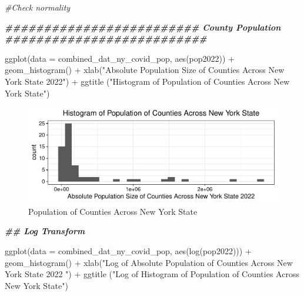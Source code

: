 \documentclass[
  12pt,
]{article}
\newenvironment{Shaded}{\begin{snugshade}}{\end{snugshade}}
\newcommand{\AttributeTok}[1]{\textcolor[rgb]{0.77,0.63,0.00}{#1}}
\newcommand{\CommentTok}[1]{\textcolor[rgb]{0.56,0.35,0.01}{\textit{#1}}}
\newcommand{\DocumentationTok}[1]{\textcolor[rgb]{0.56,0.35,0.01}{\textbf{\textit{#1}}}}
\newcommand{\FunctionTok}[1]{\textcolor[rgb]{0.00,0.00,0.00}{#1}}
\newcommand{\NormalTok}[1]{#1}
\newcommand{\SpecialCharTok}[1]{\textcolor[rgb]{0.00,0.00,0.00}{#1}}
\newcommand{\StringTok}[1]{\textcolor[rgb]{0.31,0.60,0.02}{#1}}
\begin{document}
\begin{Shaded}
\begin{Highlighting}[]
\CommentTok{\#Check normality}
\end{Highlighting}
\end{Shaded}

\begin{Shaded}
\begin{Highlighting}[]
\DocumentationTok{\#\#\#\#\#\#\#\#\#\#\#\#\#\#\#\#\#\#\#\#\#\#\#\#\# County Population \#\#\#\#\#\#\#\#\#\#\#\#\#\#\#\#\#\#\#\#\#\#\#\#\#\#}

\FunctionTok{ggplot}\NormalTok{(}\AttributeTok{data =}\NormalTok{ combined\_dat\_ny\_covid\_pop, }\FunctionTok{aes}\NormalTok{(pop2022)) }\SpecialCharTok{+}
  \FunctionTok{geom\_histogram}\NormalTok{() }\SpecialCharTok{+}
  \FunctionTok{xlab}\NormalTok{(}\StringTok{"Absolute Population Size of Counties Across New York State 2022"}\NormalTok{) }\SpecialCharTok{+}
  \FunctionTok{ggtitle}\NormalTok{ (}\StringTok{"Histogram of Population of Counties Across New York State"}\NormalTok{)}
\end{Highlighting}
\end{Shaded}

\begin{figure}

{\centering \includegraphics{EDA_Final_Group_Project_files/figure-latex/unnamed-chunk-8-1} 

}

\caption{Population of Counties Across New York State}\label{fig:unnamed-chunk-8}
\end{figure}

\begin{Shaded}
\begin{Highlighting}[]
\DocumentationTok{\#\# Log Transform}

\FunctionTok{ggplot}\NormalTok{(}\AttributeTok{data =}\NormalTok{ combined\_dat\_ny\_covid\_pop, }\FunctionTok{aes}\NormalTok{(}\FunctionTok{log}\NormalTok{(pop2022))) }\SpecialCharTok{+}
  \FunctionTok{geom\_histogram}\NormalTok{() }\SpecialCharTok{+}
  \FunctionTok{xlab}\NormalTok{(}\StringTok{"Log of Absolute Population of Counties Across New York State 2022 "}\NormalTok{) }\SpecialCharTok{+}
  \FunctionTok{ggtitle}\NormalTok{ (}\StringTok{"Log of Histogram of Population of Counties Across New York State"}\NormalTok{)}
\end{Highlighting}
\end{Shaded}
\end{document}
